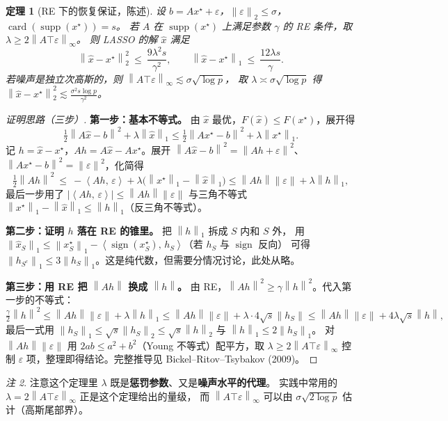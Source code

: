 \documentclass[11pt,a4paper,UTF8]{ctexart}
\theoremstyle{plain}
\newtheorem{theorem}{定理}[section]
\theoremstyle{definition}
\theoremstyle{remark}
\newtheorem{remark}[theorem]{注}
\newcommand{\norm}[1]{\left\lVert #1 \right\rVert}
\newcommand{\inner}[2]{\left\langle #1,\, #2 \right\rangle}
\newcommand{\supp}{\operatorname{supp}}
\DeclareMathOperator{\sign}{sign}
\DeclareMathOperator{\card}{card}
\newcommand{\eps}{\varepsilon}
\begin{document}
\begin{theorem}[RE 下的恢复保证，陈述]\label{thm:re}
设 $b=Ax^\star+\eps$，$\norm{\eps}_2\le\sigma$，$\card(\supp(x^\star))=s$。
若 $A$ 在 $\supp(x^\star)$ 上满足参数 $\gamma$ 的 RE 条件，取 $\lambda\ge2\norm{A\top\eps}_\infty$。
则 LASSO 的解 $\hat x$ 满足
\[
\norm{\hat x-x^\star}_2^2\ \le\ \frac{9\lambda^2s}{\gamma^2},
\qquad
\norm{\hat x-x^\star}_1\ \le\ \frac{12\lambda s}{\gamma}.
\]
若噪声是独立次高斯的，则 $\norm{A\top\eps}_\infty\lesssim\sigma\sqrt{\log p}$，
取 $\lambda\asymp\sigma\sqrt{\log p}$ 得
$\norm{\hat x-x^\star}_2^2\lesssim\frac{\sigma^2s\log p}{\gamma^2}$。
\end{theorem}

\begin{proof}[证明思路（三步）]
\textbf{第一步：基本不等式。} 由 $\hat x$ 最优，$F(\hat x)\le F(x^\star)$，展开得
\[
\tfrac12\norm{A\hat x-b}^2+\lambda\norm{\hat x}_1\le\tfrac12\norm{Ax^\star-b}^2+\lambda\norm{x^\star}_1 .
\]
记 $h=\hat x-x^\star$，$A h=A\hat x-Ax^\star$。展开 $\norm{A\hat x-b}^2=\norm{Ah+\eps}^2$、
$\norm{Ax^\star-b}^2=\norm{\eps}^2$，化简得
\[
\tfrac12\norm{Ah}^2\ \le\ -\inner{Ah}{\eps}+\lambda\bigl(\norm{x^\star}_1-\norm{\hat x}_1\bigr)
\le\norm{Ah}\norm{\eps}+\lambda\norm{h}_1 ,
\]
最后一步用了 $|\inner{Ah}{\eps}|\le\norm{Ah}\norm{\eps}$ 与三角不等式
$\norm{x^\star}_1-\norm{\hat x}_1\le\norm{h}_1$（反三角不等式）。

\textbf{第二步：证明 $h$ 落在 RE 的锥里。} 把 $\norm{h}_1$ 拆成 $S$ 内和 $S$ 外，
用 $\norm{\hat x_S}_1\le\norm{x^\star_S}_1-\inner{\sign(x^\star_S)}{h_S}$（若 $h_S$ 与 $\sign$ 反向）
可得 $\norm{h_{S^c}}_1\le3\norm{h_S}_1$。这是纯代数，但需要分情况讨论，此处从略。

\textbf{第三步：用 RE 把 $\norm{Ah}$ 换成 $\norm h$。}
由 RE，$\norm{Ah}^2\ge\gamma\norm h^2$。代入第一步的不等式：
\[
\tfrac\gamma2\norm h^2\le\norm{Ah}\norm\eps+\lambda\norm h_1
\le\norm{Ah}\norm\eps+\lambda\cdot4\sqrt s\norm{h_S}\le\norm{Ah}\norm\eps+4\lambda\sqrt s\norm h ,
\]
最后一式用 $\norm{h_S}_1\le\sqrt s\norm{h_S}_2\le\sqrt s\norm h_2$ 与 $\norm h_1\le2\norm{h_S}_1$。
对 $\norm{Ah}\norm\eps$ 用 $2ab\le a^2+b^2$（Young 不等式）配平方，取
$\lambda\ge2\norm{A\top\eps}_\infty$ 控制 $\eps$ 项，整理即得结论。完整推导见
Bickel--Ritov--Tsybakov (2009)。
\end{proof}

\begin{remark}
注意这个定理里 $\lambda$ 既是\textbf{惩罚参数}、又是\textbf{噪声水平的代理}。
实践中常用的 $\lambda=2\norm{A\top\eps}_\infty$ 正是这个定理给出的量级，
而 $\norm{A\top\eps}_\infty$ 可以由 $\sigma\sqrt{2\log p}$ 估计（高斯尾部界）。
\end{remark}
\end{document}

